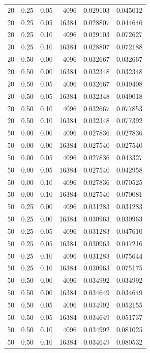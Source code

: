 \begin{longtable}{rrrrrr}
20 & 0.25 & 0.05 & 4096 & 0.029103 & 0.045012\\
20 & 0.25 & 0.05 & 16384 & 0.028807 & 0.044646\\
20 & 0.25 & 0.10 & 4096 & 0.029103 & 0.072627\\
20 & 0.25 & 0.10 & 16384 & 0.028807 & 0.072188\\
20 & 0.50 & 0.00 & 4096 & 0.032667 & 0.032667\\
20 & 0.50 & 0.00 & 16384 & 0.032348 & 0.032348\\
20 & 0.50 & 0.05 & 4096 & 0.032667 & 0.049408\\
20 & 0.50 & 0.05 & 16384 & 0.032348 & 0.049018\\
20 & 0.50 & 0.10 & 4096 & 0.032667 & 0.077853\\
20 & 0.50 & 0.10 & 16384 & 0.032348 & 0.077392\\
50 & 0.00 & 0.00 & 4096 & 0.027836 & 0.027836\\
50 & 0.00 & 0.00 & 16384 & 0.027540 & 0.027540\\
50 & 0.00 & 0.05 & 4096 & 0.027836 & 0.043327\\
50 & 0.00 & 0.05 & 16384 & 0.027540 & 0.042958\\
50 & 0.00 & 0.10 & 4096 & 0.027836 & 0.070525\\
50 & 0.00 & 0.10 & 16384 & 0.027540 & 0.070081\\
50 & 0.25 & 0.00 & 4096 & 0.031283 & 0.031283\\
50 & 0.25 & 0.00 & 16384 & 0.030963 & 0.030963\\
50 & 0.25 & 0.05 & 4096 & 0.031283 & 0.047610\\
50 & 0.25 & 0.05 & 16384 & 0.030963 & 0.047216\\
50 & 0.25 & 0.10 & 4096 & 0.031283 & 0.075644\\
50 & 0.25 & 0.10 & 16384 & 0.030963 & 0.075175\\
50 & 0.50 & 0.00 & 4096 & 0.034992 & 0.034992\\
50 & 0.50 & 0.00 & 16384 & 0.034649 & 0.034649\\
50 & 0.50 & 0.05 & 4096 & 0.034992 & 0.052155\\
50 & 0.50 & 0.05 & 16384 & 0.034649 & 0.051737\\
50 & 0.50 & 0.10 & 4096 & 0.034992 & 0.081025\\
50 & 0.50 & 0.10 & 16384 & 0.034649 & 0.080532\\
\bottomrule
\end{longtable}
